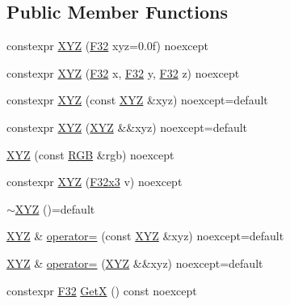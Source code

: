 \subsection*{Public Member Functions}
\begin{DoxyCompactItemize}
\item 
constexpr \mbox{\hyperlink{structmage_1_1_x_y_z_af8b9ef53daa7463097c6397644a24ebf}{X\+YZ}} (\mbox{\hyperlink{namespacemage_aa97e833b45f06d60a0a9c4fc22ae02c0}{F32}} xyz=0.\+0f) noexcept
\item 
constexpr \mbox{\hyperlink{structmage_1_1_x_y_z_af1a6e6dd912ef8513640bd7a45af01d5}{X\+YZ}} (\mbox{\hyperlink{namespacemage_aa97e833b45f06d60a0a9c4fc22ae02c0}{F32}} x, \mbox{\hyperlink{namespacemage_aa97e833b45f06d60a0a9c4fc22ae02c0}{F32}} y, \mbox{\hyperlink{namespacemage_aa97e833b45f06d60a0a9c4fc22ae02c0}{F32}} z) noexcept
\item 
constexpr \mbox{\hyperlink{structmage_1_1_x_y_z_a340b36d0ef87c20f3ff4123e71fb6894}{X\+YZ}} (const \mbox{\hyperlink{structmage_1_1_x_y_z}{X\+YZ}} \&xyz) noexcept=default
\item 
constexpr \mbox{\hyperlink{structmage_1_1_x_y_z_abfabc56fbe50948bc3d894178685453a}{X\+YZ}} (\mbox{\hyperlink{structmage_1_1_x_y_z}{X\+YZ}} \&\&xyz) noexcept=default
\item 
\mbox{\hyperlink{structmage_1_1_x_y_z_a7502d9fa2f8d6bf59d00bcdb45c4fcd0}{X\+YZ}} (const \mbox{\hyperlink{structmage_1_1_r_g_b}{R\+GB}} \&rgb) noexcept
\item 
constexpr \mbox{\hyperlink{structmage_1_1_x_y_z_af2edf71f76a8c7d457229adaf904fb07}{X\+YZ}} (\mbox{\hyperlink{namespacemage_a0fef5ab4e073c2d9ea876fefa3da4233}{F32x3}} v) noexcept
\item 
\mbox{\hyperlink{structmage_1_1_x_y_z_a07eb7ce1ad3308774b0bbad3a7f121ce}{$\sim$\+X\+YZ}} ()=default
\item 
\mbox{\hyperlink{structmage_1_1_x_y_z}{X\+YZ}} \& \mbox{\hyperlink{structmage_1_1_x_y_z_a817c69124934fa9ad5d7d63b5696c939}{operator=}} (const \mbox{\hyperlink{structmage_1_1_x_y_z}{X\+YZ}} \&xyz) noexcept=default
\item 
\mbox{\hyperlink{structmage_1_1_x_y_z}{X\+YZ}} \& \mbox{\hyperlink{structmage_1_1_x_y_z_aa8b016328f6210e3b0b13cff7087dbee}{operator=}} (\mbox{\hyperlink{structmage_1_1_x_y_z}{X\+YZ}} \&\&xyz) noexcept=default
\item 
constexpr \mbox{\hyperlink{namespacemage_aa97e833b45f06d60a0a9c4fc22ae02c0}{F32}} \mbox{\hyperlink{structmage_1_1_x_y_z_ad11318d8920b1782b07c4ac30d4c0204}{GetX}} () const noexcept

\end{DoxyCompactItemize}

